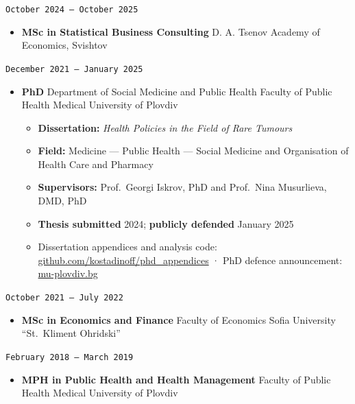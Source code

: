 \documentclass[
  10.5pt,
  a4paper,
  DIV=11,
  numbers=noendperiod]{scrartcl}
\providecommand{\tightlist}{%
  \setlength{\itemsep}{0pt}\setlength{\parskip}{0pt}}
\let\oldtexttt\texttt
\renewcommand{\texttt}[1]{{\color{cvbronze}\small\oldtexttt{#1}}}
\begin{document}
\texttt{October\ 2024\ –\ October\ 2025}

\begin{itemize}
\tightlist
\item
  \textbf{MSc in Statistical Business Consulting} \textbar{} D. A.
  Tsenov Academy of Economics, Svishtov
\end{itemize}

\texttt{December\ 2021\ –\ January\ 2025}

\begin{itemize}
\tightlist
\item
  \textbf{PhD} \textbar{} Department of Social Medicine and Public
  Health \textbar{} Faculty of Public Health \textbar{} Medical
  University of Plovdiv

  \begin{itemize}
  \tightlist
  \item
    \textbf{Dissertation:} \emph{Health Policies in the Field of Rare
    Tumours}
  \item
    \textbf{Field:} Medicine --- Public Health --- Social Medicine and
    Organisation of Health Care and Pharmacy
  \item
    \textbf{Supervisors:} Prof.~Georgi Iskrov, PhD and Prof.~Nina
    Musurlieva, DMD, PhD
  \item
    \textbf{Thesis submitted} 2024; \textbf{publicly defended} January
    2025
  \item
    Dissertation appendices and analysis code:
    \href{https://github.com/kostadinoff/phd_appendices}{github.com/kostadinoff/phd\_appendices}
    · PhD defence announcement:
    \href{https://mu-plovdiv.bg/d-r-kostadin-rangelov-kostadinov/}{mu-plovdiv.bg}
  \end{itemize}
\end{itemize}

\texttt{October\ 2021\ –\ July\ 2022}

\begin{itemize}
\tightlist
\item
  \textbf{MSc in Economics and Finance} \textbar{} Faculty of Economics
  \textbar{} Sofia University ``St.~Kliment Ohridski''
\end{itemize}

\texttt{February\ 2018\ –\ March\ 2019}

\begin{itemize}
\tightlist
\item
  \textbf{MPH in Public Health and Health Management} \textbar{} Faculty
  of Public Health \textbar{} Medical University of Plovdiv
\end{itemize}
\end{document}
